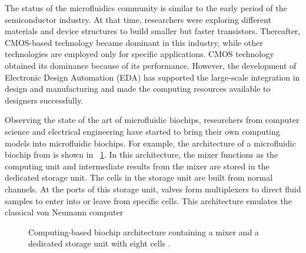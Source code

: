     The %
    status of
    the microfluidics community is similar to the early
    period of the semiconductor industry. At that time, researchers
    were exploring different materials and device structures to build smaller but
    faster transistors. Thereafter, CMOS-based technology became dominant
    in this industry, while other technologies are 
    employed only for specific applications. 
    CMOS technology obtained its dominance because of
    its performance. 
    However, the development of Electronic Design Automation (EDA) has 
    supported the large-scale integration in design and manufacturing and
    made the computing resources available to designers successfully.
     
    Observing the state of the art of microfluidic biochips, 
    researchers from computer science and 
    electrical engineering have
    started to bring their own computing models into microfluidic biochips. For
    example, the architecture of a microfluidic biochip from
    \cite{AminTA09} is shown in \figname~\ref{fig:biochip_arch}.
    In this architecture, the 
    mixer functions as
    the computing unit and intermediate results from the mixer are stored in the
    dedicated storage unit. The cells in the storage unit are built from
    normal channels. At the ports of this 
    storage unit, valves form
    multiplexers to direct fluid samples to enter into or leave from specific
    cells. This architecture emulates the classical von Neumann computer 


\begin{figure}
    {
    \vskip -6pt
    \figurefontsize
    \centering
    
    \caption{Computing-based biochip architecture containing a mixer and a dedicated
    storage unit with eight cells \cite{AminTA09}.}
    \label{fig:biochip_arch}
    }
    \end{figure}

